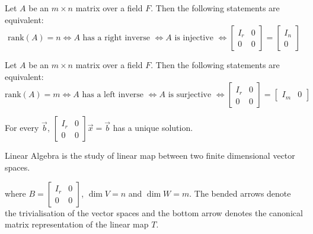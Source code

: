 \documentclass[
	11pt, %
	fleqn, %
	a4paper, %
]{LegrandOrangeBook}
\begin{document}
\begin{proposition}
    Let $A$ be an $m \times n$ matrix over a field $F$. Then the following statements are equivalent:
    \[
        \text{rank}(A) = n \iff A \text{ has a right inverse } \iff A \text{ is injective } \iff \begin{bmatrix}
            I_r & 0 \\
            0 & 0
        \end{bmatrix} = \begin{bmatrix}
            I_n \\
            0
        \end{bmatrix}
    \]
\end{proposition}

\begin{proposition}
    Let $A$ be an $m \times n$ matrix over a field $F$. Then the following statements are equivalent:
    \[
        \text{rank}(A) = m \iff A \text{ has a left inverse } \iff A \text{ is surjective } \iff \begin{bmatrix}
            I_r & 0 \\
            0 & 0
        \end{bmatrix} = \begin{bmatrix}
            I_m & 0
        \end{bmatrix}
    \]
\end{proposition}

\begin{proposition}
    For every $\vec{b}$, $\begin{bmatrix}
        I_r & 0 \\
        0 & 0
    \end{bmatrix} \vec{x} = \vec{b}$ has a unique solution.
\end{proposition}

Linear Algebra is the study of linear map between two finite dimensional vector spaces.

\begin{center}
\end{center}
where $B = \begin{bmatrix}
    I_r & 0 \\
    0 & 0
\end{bmatrix}$, $\dim V = n$ and $\dim W = m$.
The bended arrows denote the trivialisation of the vector spaces and the bottom arrow denotes the canonical matrix representation of the linear map $T$.
\end{document}
